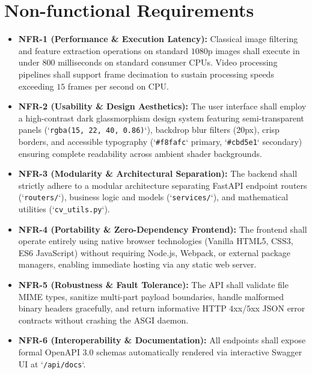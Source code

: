 \section{Non-functional Requirements}
\begin{itemize}
    \item \textbf{NFR-1 (Performance \& Execution Latency):} Classical image filtering and feature extraction operations on standard $1080$p images shall execute in under $800$ milliseconds on standard consumer CPUs. Video processing pipelines shall support frame decimation to sustain processing speeds exceeding $15$ frames per second on CPU.
    \item \textbf{NFR-2 (Usability \& Design Aesthetics):} The user interface shall employ a high-contrast dark glassmorphism design system featuring semi-transparent panels (`\texttt{rgba(15, 22, 40, 0.86)}`), backdrop blur filters ($20$px), crisp borders, and accessible typography (`\texttt{\#f8fafc}` primary, `\texttt{\#cbd5e1}` secondary) ensuring complete readability across ambient shader backgrounds.
    \item \textbf{NFR-3 (Modularity \& Architectural Separation):} The backend shall strictly adhere to a modular architecture separating FastAPI endpoint routers (`\texttt{routers/}`), business logic and models (`\texttt{services/}`), and mathematical utilities (`\texttt{cv\_utils.py}`).
    \item \textbf{NFR-4 (Portability \& Zero-Dependency Frontend):} The frontend shall operate entirely using native browser technologies (Vanilla HTML5, CSS3, ES6 JavaScript) without requiring Node.js, Webpack, or external package managers, enabling immediate hosting via any static web server.
    \item \textbf{NFR-5 (Robustness \& Fault Tolerance):} The API shall validate file MIME types, sanitize multi-part payload boundaries, handle malformed binary headers gracefully, and return informative HTTP $4$xx/$5$xx JSON error contracts without crashing the ASGI daemon.
    \item \textbf{NFR-6 (Interoperability \& Documentation):} All endpoints shall expose formal OpenAPI 3.0 schemas automatically rendered via interactive Swagger UI at `\texttt{/api/docs}`.
\end{itemize}

